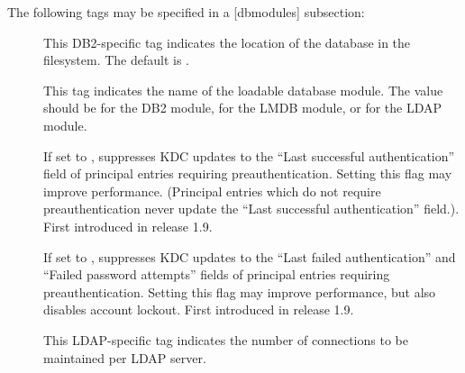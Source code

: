 \documentclass[letterpaper,10pt,english]{sphinxmanual}
\begin{document}
%
\begin{sphinxVerbatim}[commandchars=\\\{\}]
\PYG{p}{[}\PYG{p}{]}
      
          
\end{sphinxVerbatim}

The following tags may be specified in a {[}dbmodules{]} subsection:
\begin{description}
\item[{}] \leavevmode
This DB2-specific tag indicates the location of the database in
the filesystem.  The default is {\hyperref[\detokenize{mitK5defaults:paths}]{}}.

\item[{}] \leavevmode
This tag indicates the name of the loadable database module.  The
value should be  for the DB2 module,  for the LMDB
module, or  for the LDAP module.

\item[{}] \leavevmode
If set to , suppresses KDC updates to the “Last successful
authentication” field of principal entries requiring
preauthentication.  Setting this flag may improve performance.
(Principal entries which do not require preauthentication never
update the “Last successful authentication” field.).  First
introduced in release 1.9.

\item[{}] \leavevmode
If set to , suppresses KDC updates to the “Last failed
authentication” and “Failed password attempts” fields of principal
entries requiring preauthentication.  Setting this flag may
improve performance, but also disables account lockout.  First
introduced in release 1.9.

\item[{}] \leavevmode
This LDAP-specific tag indicates the number of connections to be
maintained per LDAP server.


\end{description}
\end{document}
